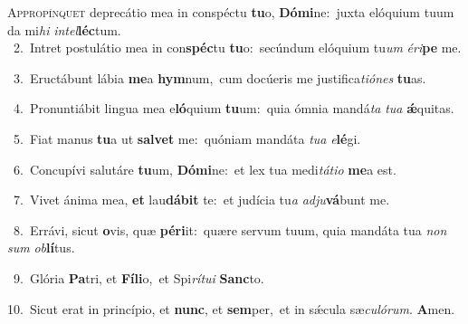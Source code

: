 \lettrine{\initial\textcolor{\initialcolor}{A}}{ppropínquet} deprecátio mea in conspéctu \textbf{tu}\-o, \textbf{Dó}\-\textbf{mi}ne:~\star juxta elóquium tuum da mi\textit{hi} \textit{in}\-\textit{tel}\textbf{léc}tum.\\
{\numbfont\textcolor{\numbcolor}{~2.}}~Intret postulátio mea in con\-\textbf{spéc}\-tu \textbf{tu}\-o:~\star secúndum elóquium tu\textit{um} \textit{é}\-\textit{ri}\textbf{pe} me.\par
{\numbfont\textcolor{\numbcolor}{~3.}}~Eructábunt lábia \textbf{me}\-a \textbf{hym}\-num,~\star cum docúeris me justifica\-\textit{ti}\-\textit{ó}\textit{nes} \textbf{tu}\-as.\par
{\numbfont\textcolor{\numbcolor}{~4.}}~Pronuntiábit lingua mea e\-\textbf{ló}\-quium \textbf{tu}\-um:~\star quia ómnia mandá\textit{ta} \textit{tu}\-\textit{a} \textbf{ǽ}\-quitas.\par
{\numbfont\textcolor{\numbcolor}{~5.}}~Fiat manus \textbf{tu}\-a ut \textbf{sal}\-\textbf{vet} me:~\star quóniam mandáta \textit{tu}\-\textit{a} \textit{e}\-\textbf{lé}gi.\par
{\numbfont\textcolor{\numbcolor}{~6.}}~Concupívi salutáre \textbf{tu}\-um, \textbf{Dó}\-\textbf{mi}ne:~\star et lex tua medi\-\textit{tá}\-\textit{ti}\textit{o} \textbf{me}\-a est.\par
{\numbfont\textcolor{\numbcolor}{~7.}}~Vivet ánima mea, \textbf{et} lau\-\textbf{dá}\-\textbf{bit} te:~\star et judícia tu\textit{a} \textit{ad}\-\textit{ju}\textbf{vá}bunt me.\par
{\numbfont\textcolor{\numbcolor}{~8.}}~Errávi, sicut \textbf{o}\-vis, quæ \textbf{pér}\-\textbf{i}it:~\star quære servum tuum, quia mandáta tua \textit{non} \textit{sum} \textit{ob}\-\textbf{lí}tus.\par
{\numbfont\textcolor{\numbcolor}{~9.}}~Glória \textbf{Pa}\-tri, et \textbf{Fí}\-\textbf{li}o,~\star et Spi\-\textit{rí}\-\textit{tu}\textit{i} \textbf{Sanc}\-to.\par
{\numbfont\textcolor{\numbcolor}{10.}}~Sicut erat in princípio, et \textbf{nunc}\-, et \textbf{sem}\-per,~\star et in sǽcula sæ\-\textit{cu}\-\textit{ló}\textit{rum}. \textbf{A}\-men.\par
